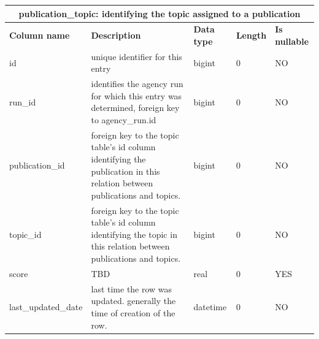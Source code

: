 \documentclass[titlepage, 11pt]{article}
\begin{document}
{\begin{table}[h!]
{\begin{tabularx}{1\textwidth} {|p{4cm}|p{5.33cm}|p{2cm}|p{1.5cm}|p{1.5cm}|}
\end{tabularx}
\label{table: appendix b - publication author}
}
\end{table}

\begin{table}[h!]

{\renewcommand{\arraystretch}{1.5}%
\begin{tabularx}{1\textwidth} {|p{4cm}|p{5.33cm}|p{2cm}|p{1.5cm}|p{1.5cm}|}
 \hline
 \multicolumn{5}{|c|}{\textbf{publication\_topic: identifying the topic assigned to a publication}}\\
 \hline
 \textbf{Column name} & \textbf{Description} & \textbf{Data type} & \textbf{Length} & \textbf{Is nullable} \\
 \hline
 id & unique identifier for this entry & bigint   & 0 & NO  \\
 \hline
 run\_id & identifies the agency run for which this entry was determined, foreign key to agency\_run.id & bigint   & 0 & NO  \\
 \hline
 publication\_id & foreign key to the topic table's id column identifying the publication in this relation between publications and topics. & bigint & 0 & NO \\
 \hline
topic\_id  & foreign key to the topic table's id column identifying the topic in this relation between publications and topics.  & bigint & 0 & NO \\
 \hline
 score  & TBD & real     & 0 & YES \\
 \hline
 last\_updated\_date & last time the row was updated. generally the time of creation of the row. & datetime & 0 & NO \\
\hline

\end{tabularx}
\label{table: appendix b - publication topic}
}
\end{table}

\begin{table}[h!]


\end{table}}
\end{document}
